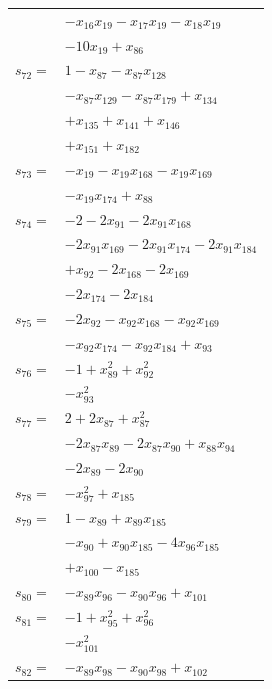 \begin{longtable}{@{}r@{\;}l@{}}
 & \(\displaystyle -x_{16}x_{19} -x_{17}x_{19} -x_{18}x_{19}\) \\
 & \(\displaystyle -10x_{19} +x_{86}\) \\[3pt]
\(s_{72}=\) & \(\displaystyle 1 -x_{87} -x_{87}x_{128}\) \\
 & \(\displaystyle -x_{87}x_{129} -x_{87}x_{179} +x_{134}\) \\
 & \(\displaystyle +x_{135} +x_{141} +x_{146}\) \\
 & \(\displaystyle +x_{151} +x_{182}\) \\[3pt]
\(s_{73}=\) & \(\displaystyle -x_{19} -x_{19}x_{168} -x_{19}x_{169}\) \\
 & \(\displaystyle -x_{19}x_{174} +x_{88}\) \\[3pt]
\(s_{74}=\) & \(\displaystyle -2 -2x_{91} -2x_{91}x_{168}\) \\
 & \(\displaystyle -2x_{91}x_{169} -2x_{91}x_{174} -2x_{91}x_{184}\) \\
 & \(\displaystyle +x_{92} -2x_{168} -2x_{169}\) \\
 & \(\displaystyle -2x_{174} -2x_{184}\) \\[3pt]
\(s_{75}=\) & \(\displaystyle -2x_{92} -x_{92}x_{168} -x_{92}x_{169}\) \\
 & \(\displaystyle -x_{92}x_{174} -x_{92}x_{184} +x_{93}\) \\[3pt]
\(s_{76}=\) & \(\displaystyle -1 +x_{89}^{2} +x_{92}^{2}\) \\
 & \(\displaystyle -x_{93}^{2}\) \\[3pt]
\(s_{77}=\) & \(\displaystyle 2 +2x_{87} +x_{87}^{2}\) \\
 & \(\displaystyle -2x_{87}x_{89} -2x_{87}x_{90} +x_{88}x_{94}\) \\
 & \(\displaystyle -2x_{89} -2x_{90}\) \\[3pt]
\(s_{78}=\) & \(\displaystyle -x_{97}^{2} +x_{185}\) \\[3pt]
\(s_{79}=\) & \(\displaystyle 1 -x_{89} +x_{89}x_{185}\) \\
 & \(\displaystyle -x_{90} +x_{90}x_{185} -4x_{96}x_{185}\) \\
 & \(\displaystyle +x_{100} -x_{185}\) \\[3pt]
\(s_{80}=\) & \(\displaystyle -x_{89}x_{96} -x_{90}x_{96} +x_{101}\) \\[3pt]
\(s_{81}=\) & \(\displaystyle -1 +x_{95}^{2} +x_{96}^{2}\) \\
 & \(\displaystyle -x_{101}^{2}\) \\[3pt]
\(s_{82}=\) & \(\displaystyle -x_{89}x_{98} -x_{90}x_{98} +x_{102}\) \\[3pt]

\end{longtable}
